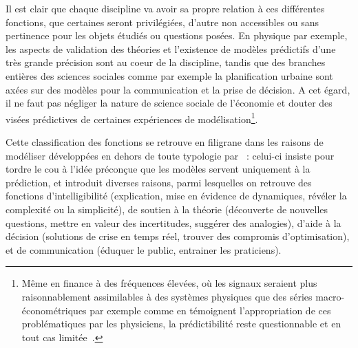 
Il est clair que chaque discipline va avoir sa propre relation à ces différentes fonctions, que certaines seront privilégiées, d'autre non accessibles ou sans pertinence pour les objets étudiés ou questions posées. En physique par exemple, les aspects de validation des théories et l'existence de modèles prédictifs d'une très grande précision sont au coeur de la discipline, tandis que des branches entières des sciences sociales comme par exemple la planification urbaine sont axées sur des modèles pour la communication et la prise de décision. A cet égard, il ne faut pas négliger la nature de science sociale de l'économie et douter des visées prédictives de certaines expériences de modélisation\footnote{Même en finance à des fréquences élevées, où les signaux seraient plus raisonnablement assimilables à des systèmes physiques que des séries macro-économétriques par exemple comme en témoignent l'appropriation de ces problématiques par les physiciens, la prédictibilité reste questionnable et en tout cas limitée~\cite{campbell2007predicting}.}. 


Cette classification des fonctions se retrouve en filigrane dans les raisons de modéliser développées en dehors de toute typologie par~\cite{epstein2008model} : celui-ci insiste pour tordre le cou à l'idée préconçue que les modèles servent uniquement à la prédiction, et introduit diverses raisons, parmi lesquelles on retrouve des fonctions d'intelligibilité (explication, mise en évidence de dynamiques, révéler la complexité ou la simplicité), de soutien à la théorie (découverte de nouvelles questions, mettre en valeur des incertitudes, suggérer des analogies), d'aide à la décision (solutions de crise en temps réel, trouver des compromis d'optimisation), et de communication (éduquer le public, entrainer les praticiens).


